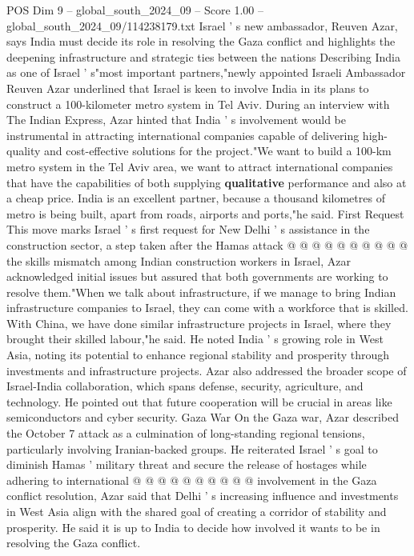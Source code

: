 \begin{textsample}{POS Dim 9 – global\_south\_2024\_09 – Score 1.00 – global\_south\_2024\_09/114238179.txt}  \label{ex:f9_pos_252}
Israel ' s new ambassador, Reuven Azar, says India must decide its role in resolving the Gaza conflict and highlights the deepening infrastructure and strategic ties between the nations Describing India as one of Israel ' s"most important partners,"newly appointed Israeli Ambassador Reuven Azar underlined that Israel is keen to involve India in its plans to construct a 100-kilometer metro system in Tel Aviv.
During an interview with The Indian Express, Azar hinted that India ' s involvement would be instrumental in attracting international companies capable of delivering high-quality and cost-effective solutions for the project."We want to build a 100-km metro system in the Tel Aviv area, we want to attract international companies that have the capabilities of both supplying \textbf{qualitative} performance and also at a cheap price.
India is an excellent partner, because a thousand kilometres of metro is being built, apart from roads, airports and ports,"he said.
First Request This move marks Israel ' s first request for New Delhi ' s assistance in the construction sector, a step taken after the Hamas attack @ @ @ @ @ @ @ @ @ @ the skills mismatch among Indian construction workers in Israel, Azar acknowledged initial issues but assured that both governments are working to resolve them."When we talk about infrastructure, if we manage to bring Indian infrastructure companies to Israel, they can come with a workforce that is skilled.
With China, we have done similar infrastructure projects in Israel, where they brought their skilled labour,"he said.
He noted India ' s growing role in West Asia, noting its potential to enhance regional stability and prosperity through investments and infrastructure projects.
Azar also addressed the broader scope of Israel-India collaboration, which spans defense, security, agriculture, and technology.
He pointed out that future cooperation will be crucial in areas like semiconductors and cyber security.
Gaza War On the Gaza war, Azar described the October 7 attack as a culmination of long-standing regional tensions, particularly involving Iranian-backed groups.
He reiterated Israel ' s goal to diminish Hamas ' military threat and secure the release of hostages while adhering to international @ @ @ @ @ @ @ @ @ @ involvement in the Gaza conflict resolution, Azar said that Delhi ' s increasing influence and investments in West Asia align with the shared goal of creating a corridor of stability and prosperity.
He said it is up to India to decide how involved it wants to be in resolving the Gaza conflict.

\end{textsample}
